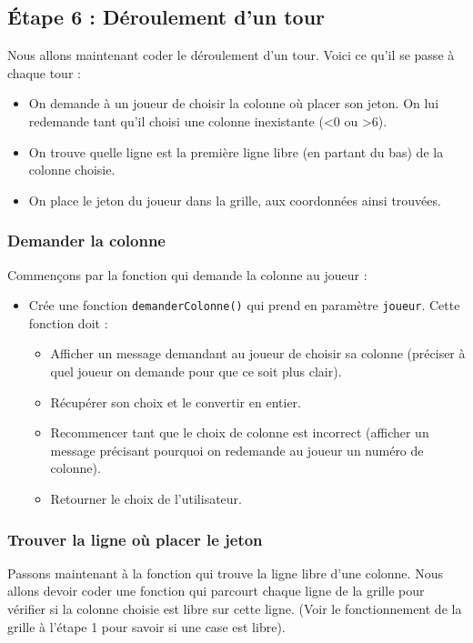 \documentclass[11pt]{article}
\begin{document}
\subsection*{Étape 6 : Déroulement d'un tour}
\label{puissance4_etape6}
Nous allons maintenant coder le déroulement d'un tour. Voici ce qu'il se passe à chaque tour :
\begin{itemize}
\item On demande à un joueur de choisir la colonne où placer son jeton. On lui redemande tant qu'il choisi une colonne inexistante (<0 ou >6).
\item On trouve quelle ligne est la première ligne libre (en partant du bas) de la colonne choisie.
\item On place le jeton du joueur dans la grille, aux coordonnées ainsi trouvées.
\end{itemize}

\subsubsection*{Demander la colonne}
\label{sec:org3fa3f26}
Commençons par la fonction qui demande la colonne au joueur :
\begin{itemize}
\item Crée une fonction \texttt{demanderColonne()} qui prend en paramètre \texttt{joueur}. Cette fonction doit :
\begin{itemize}
\item Afficher un message demandant au joueur de choisir sa colonne (préciser à quel joueur on demande pour que ce soit plus clair).
\item Récupérer son choix et le convertir en entier.
\item Recommencer tant que le choix de colonne est incorrect (afficher un message précisant pourquoi on redemande au joueur un numéro de colonne).
\item Retourner le choix de l'utilisateur.
\end{itemize}
\end{itemize}

\subsubsection*{Trouver la ligne où placer le jeton}
\label{sec:org02566a3}
Passons maintenant à la fonction qui trouve la ligne libre d'une colonne. Nous allons devoir coder une fonction qui parcourt chaque ligne de la grille pour vérifier si la colonne choisie est libre sur cette ligne. (Voir le fonctionnement de la grille à l'étape 1 pour savoir si une case est libre).
\end{document}
